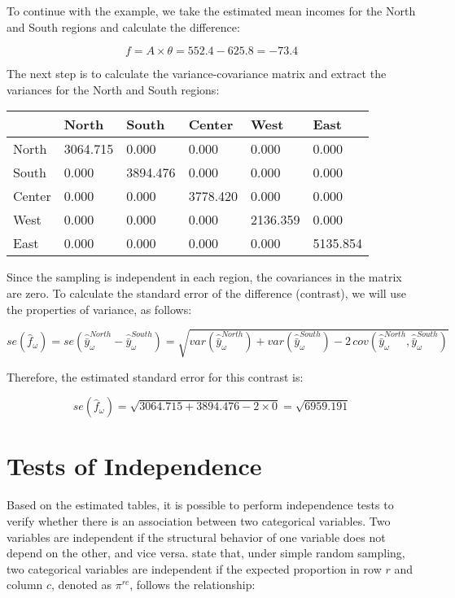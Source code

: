 \documentclass[
  12pt,
]{book}
\begin{document}
To continue with the example, we take the estimated mean incomes for the North and South regions and calculate the difference:

\[
f = A \times \theta = 552.4 - 625.8 = -73.4
\]

The next step is to calculate the variance-covariance matrix and extract the variances for the North and South regions:

\begin{longtable}[]{@{}llllll@{}}
\toprule\noalign{}
& North & South & Center & West & East \\
\midrule\noalign{}
\endhead
\bottomrule\noalign{}
\endlastfoot
North & 3064.715 & 0.000 & 0.000 & 0.000 & 0.000 \\
South & 0.000 & 3894.476 & 0.000 & 0.000 & 0.000 \\
Center & 0.000 & 0.000 & 3778.420 & 0.000 & 0.000 \\
West & 0.000 & 0.000 & 0.000 & 2136.359 & 0.000 \\
East & 0.000 & 0.000 & 0.000 & 0.000 & 5135.854 \\
\end{longtable}

Since the sampling is independent in each region, the covariances in the matrix are zero. To calculate the standard error of the difference (contrast), we will use the properties of variance, as follows:

\[
se(\hat{f}_{\omega}) = se\left(\hat{\bar{y}}^{North}_{\omega} - \hat{\bar{y}}^{South}_{\omega}\right) = \sqrt{var\left(\hat{\bar{y}}^{North}_{\omega}\right) + var\left(\hat{\bar{y}}^{South}_{\omega}\right) - 2 \, cov\left(\hat{\bar{y}}^{North}_{\omega}, \hat{\bar{y}}^{South}_{\omega}\right)}
\]

Therefore, the estimated standard error for this contrast is:

\[
se(\hat{f}_{\omega}) = \sqrt{3064.715 + 3894.476 - 2 \times 0} = \sqrt{6959.191}
\]

\hypertarget{tests-of-independence}{%
\section{Tests of Independence}\label{tests-of-independence}}

Based on the estimated tables, it is possible to perform independence tests to verify whether there is an association between two categorical variables. Two variables are independent if the structural behavior of one variable does not depend on the other, and vice versa. \citet{Heeringa_West_Berglund_2017} state that, under simple random sampling, two categorical variables are independent if the expected proportion in row \(r\) and column \(c\), denoted as \(\pi^{rc}\), follows the relationship:
\end{document}
